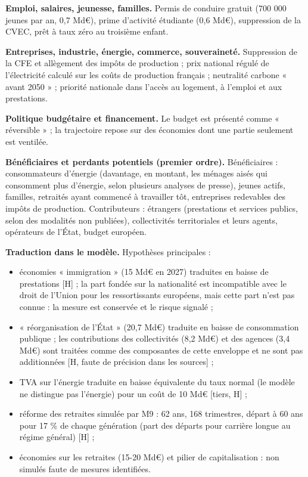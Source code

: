 \documentclass[
  11pt,
  11pt,
  a4paper,
  openany]{book}
\providecommand{\tightlist}{%
  \setlength{\itemsep}{0pt}\setlength{\parskip}{0pt}}
\begin{document}
\textbf{Emploi, salaires, jeunesse, familles.} Permis de conduire
gratuit (700 000 jeunes par an, 0,7 Md€), prime d'activité étudiante
(0,6 Md€), suppression de la CVEC, prêt à taux zéro au troisième enfant.

\textbf{Entreprises, industrie, énergie, commerce, souveraineté.}
Suppression de la CFE et allègement des impôts de production ; prix
national régulé de l'électricité calculé sur les coûts de production
français ; neutralité carbone « avant 2050 » ; priorité nationale dans
l'accès au logement, à l'emploi et aux prestations.

\textbf{Politique budgétaire et financement.} Le budget est présenté
comme « réversible » ; la trajectoire repose sur des économies dont une
partie seulement est ventilée.

\textbf{Bénéficiaires et perdants potentiels (premier ordre).}
Bénéficiaires : consommateurs d'énergie (davantage, en montant, les
ménages aisés qui consomment plus d'énergie, selon plusieurs analyses de
presse), jeunes actifs, familles, retraités ayant commencé à travailler
tôt, entreprises redevables des impôts de production. Contributeurs :
étrangers (prestations et services publics, selon des modalités non
publiées), collectivités territoriales et leurs agents, opérateurs de
l'État, budget européen.

\textbf{Traduction dans le modèle.} Hypothèses principales :

\begin{itemize}
\tightlist
\item
  économies « immigration » (15 Md€ en 2027) traduites en baisse de
  prestations {[}H{]} ; la part fondée sur la nationalité est
  incompatible avec le droit de l'Union pour les ressortissants
  européens, mais cette part n'est pas connue : la mesure est conservée
  et le risque signalé ;
\item
  « réorganisation de l'État » (20,7 Md€) traduite en baisse de
  consommation publique ; les contributions des collectivités (8,2 Md€)
  et des agences (3,4 Md€) sont traitées comme des composantes de cette
  enveloppe et ne sont pas additionnées {[}H, faute de précision dans
  les sources{]} ;
\item
  TVA sur l'énergie traduite en baisse équivalente du taux normal (le
  modèle ne distingue pas l'énergie) pour un coût de 10 Md€ {[}tiers,
  H{]} ;
\item
  réforme des retraites simulée par M9 : 62 ans, 168 trimestres, départ
  à 60 ans pour 17 \% de chaque génération (part des départs pour
  carrière longue au régime général) {[}H{]} ;
\item
  économies sur les retraites (15-20 Md€) et pilier de capitalisation :
  non simulés faute de mesures identifiées.
\end{itemize}
\end{document}

